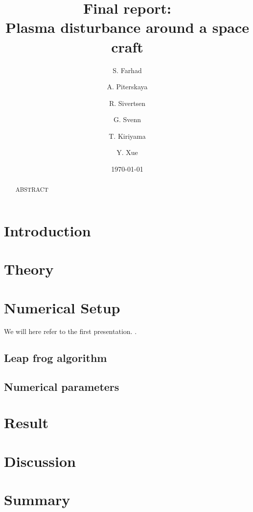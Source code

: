 \documentclass[%
 aip,
rsi,%
 amsmath,amssymb,
 reprint,%
]{revtex4-1}
\begin{document}
\title[4th 4DSpace Workshop -- Team Godzilla]{Final report:\\Plasma disturbance around a space craft}

\author{S. Farhad} 
\author{A. Piterskaya}
\author{R. Sivertsen}
\author{G. Svenn}

\author{T. Kiriyama}
\author{Y. Xue}

\date{\today}

\begin{abstract}
ABSTRACT
\end{abstract}

\maketitle

\section{\label{sec:intro} Introduction}

\section{\label{sec:theory} Theory}

\section{\label{sec:numsetup} Numerical Setup}

We will here refer to the first presentation. \cite{numsetup}.

\subsection{Leap frog algorithm}

\subsection{Numerical parameters}

\section{Result}

\section{Discussion}

\section{Summary}

\end{document}
